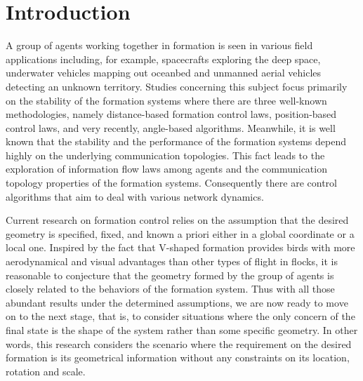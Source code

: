 \documentclass[times]{rncauth}
\begin{document}


\vspace{-6pt}







\section{Introduction}
\vspace{-2pt}
 A group of agents working together in formation is
seen in various field applications including, for example,
spacecrafts exploring the deep space, underwater vehicles mapping
out oceanbed and unmanned aerial vehicles detecting an unknown
territory. Studies concerning this subject focus primarily on the
stability of the formation systems where there are three  well-known
methodologies, namely distance-based formation control
laws\cite{Anderson07threeForm,Dimarogonas08distanceFormation},
position-based control
laws\cite{Yu09minimalPersistent,Krick09infinitesimallyRigid,Ren08distributed},
and very recently, angle-based
algorithms\cite{Moshtagh09visionFormationBearing,Basiri10angleonly}.
Meanwhile, it is well known that the stability and the performance
of the formation systems depend highly on the underlying
communication topologies. This fact leads to the exploration of
information flow laws among
agents\cite{Fax04,Olfati04consensusSwitching} and  the communication
topology properties of the formation
systems\cite{Anderson08rigidMagazine,Olfati02rigidity}. Consequently
there are control algorithms that aim to deal with various network
dynamics\cite{Olfati04consensusSwitching,Luke09formationDelay,Secchi08formationDelay}.


Current research on formation control relies on the assumption that
the desired geometry is specified, fixed, and known a
priori either in a global coordinate or a local one. Inspired by the
fact that V-shaped formation provides birds with more aerodynamical and visual
advantages than other types of flight in
flocks\cite{Nature01Vformation}, it is reasonable to conjecture that
the geometry formed by the group of agents is closely related to the
behaviors of the formation system. Thus with all those abundant
results under the determined assumptions, we are now ready to move
on to the next stage, that is, to consider situations where the only
concern of the final state is the shape of the system rather than some specific geometry.
In other words, this research considers the scenario where the
requirement on the desired formation is its geometrical information
without any constraints on its location, rotation and scale.
\end{document}
